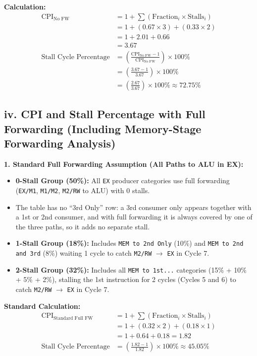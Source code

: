 \documentclass[11pt, a4paper]{article}
\begin{document}
\textbf{Calculation:}
\begin{align*}
    \text{CPI}_{\text{No FW}} &= 1 + \sum \left(\text{Fraction}_i \times \text{Stalls}_i\right) \\
    &= 1 + (0.67 \times 3) + (0.33 \times 2) \\
    &= 1 + 2.01 + 0.66 \\
    &= \mathbf{3.67} \\[6pt]
    \text{Stall Cycle Percentage} &= \left(\frac{\text{CPI}_{\text{No FW}} - 1}{\text{CPI}_{\text{No FW}}}\right) \times 100\% \\
    &= \left(\frac{3.67 - 1}{3.67}\right) \times 100\% \\
    &= \left(\frac{2.67}{3.67}\right) \times 100\% \approx \mathbf{72.75\%}
\end{align*}


\subsection*{iv. CPI and Stall Percentage with Full Forwarding (Including Memory-Stage Forwarding Analysis)}

\textbf{1. Standard Full Forwarding Assumption (All Paths to ALU in EX):}
\begin{itemize}[noitemsep, topsep=2pt]
    \item \textbf{0-Stall Group (50\%):} All \texttt{EX} producer categories use full forwarding (\texttt{EX/M1}, \texttt{M1/M2}, \texttt{M2/RW} to ALU) with 0 stalls.
    \item The table has no ``3rd Only'' row: a 3rd consumer only appears together with a 1st or 2nd consumer, and with full forwarding it is always covered by one of the three paths, so it adds no separate stall.
    \item \textbf{1-Stall Group (18\%):} Includes \texttt{MEM to 2nd Only} (10\%) and \texttt{MEM to 2nd and 3rd} (8\%) waiting 1 cycle to catch \texttt{M2/RW} $\rightarrow$ \texttt{EX} in Cycle 7.
    \item \textbf{2-Stall Group (32\%):} Includes all \texttt{MEM to 1st...} categories (15\% + 10\% + 5\% + 2\%), stalling the 1st instruction for 2 cycles (Cycles 5 and 6) to catch \texttt{M2/RW} $\rightarrow$ \texttt{EX} in Cycle 7.
\end{itemize}

\textbf{Standard Calculation:}
\begin{align*}
    \text{CPI}_{\text{Standard Full FW}} &= 1 + \sum \left(\text{Fraction}_i \times \text{Stalls}_i\right) \\
    &= 1 + (0.32 \times 2) + (0.18 \times 1) \\
    &= 1 + 0.64 + 0.18 = \mathbf{1.82} \\[4pt]
    \text{Stall Cycle Percentage} &= \left(\frac{1.82 - 1}{1.82}\right) \times 100\% \approx \mathbf{45.05\%}
\end{align*}
\end{document}
